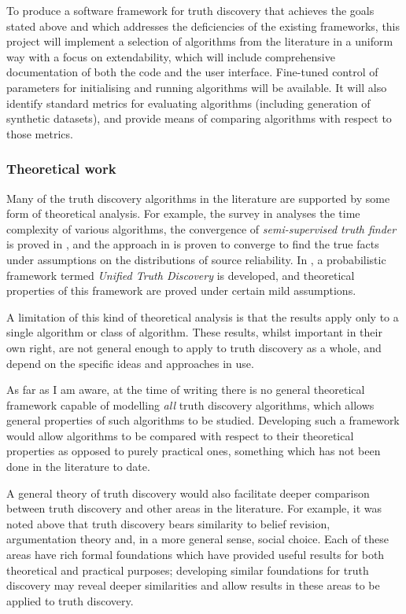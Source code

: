 \documentclass[../main.tex]{subfiles}
\begin{document}

To produce a software framework for truth discovery that achieves the goals
stated above and which addresses the deficiencies of the existing frameworks,
this project will implement a selection of algorithms from the literature in a
uniform way with a focus on extendability, which will include comprehensive
documentation of both the code and the user interface. Fine-tuned control of
parameters for initialising and running algorithms will be available. It will
also identify standard metrics for evaluating algorithms (including generation
of synthetic datasets), and provide means of comparing algorithms with respect
to those metrics.

\subsubsection{Theoretical work}

Many of the truth discovery algorithms in the literature are supported by some
form of theoretical analysis. For example, the survey in
\cite{gupta_han_survey} analyses the time complexity of various algorithms, the
convergence of \emph{semi-supervised truth finder} is proved in
\cite{yin_supervised}, and the approach in \cite{xiao} is proven to converge to
find the true facts under assumptions on the distributions of source
reliability. In \cite{xiao_thesis}, a probabilistic framework termed
\emph{Unified Truth Discovery} is developed, and theoretical properties of this
framework are proved under certain mild assumptions.

A limitation of this kind of theoretical analysis is that the results apply
only to a single algorithm or class of algorithm. These results, whilst
important in their own right, are not general enough to apply to truth
discovery as a whole, and depend on the specific ideas and approaches in use.

As far as I am aware, at the time of writing there is no general theoretical
framework capable of modelling \emph{all} truth discovery algorithms, which
allows general properties of such algorithms to be studied. Developing such a
framework would allow algorithms to be compared with respect to their
theoretical properties as opposed to purely practical ones, something which has
not been done in the literature to date.

A general theory of truth discovery would also facilitate deeper comparison
between truth discovery and other areas in the literature. For example, it was
noted above that truth discovery bears similarity to belief revision,
argumentation theory and, in a more general sense, social choice. Each of these
areas have rich formal foundations which have provided useful results for both
theoretical and practical purposes; developing similar foundations for truth
discovery may reveal deeper similarities and allow results in these areas to be
applied to truth discovery.
\end{document}

